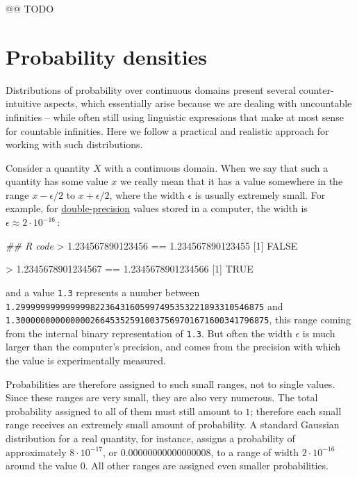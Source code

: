 \documentclass[
  a4paper,
  DIV=11,
  numbers=noendperiod,
  oneside]{scrreprt}
\newenvironment{Shaded}{\begin{snugshade}}{\end{snugshade}}
\newcommand{\ConstantTok}[1]{\textcolor[rgb]{0.56,0.35,0.01}{#1}}
\newcommand{\DecValTok}[1]{\textcolor[rgb]{0.68,0.00,0.00}{#1}}
\newcommand{\DocumentationTok}[1]{\textcolor[rgb]{0.37,0.37,0.37}{\textit{#1}}}
\newcommand{\FloatTok}[1]{\textcolor[rgb]{0.68,0.00,0.00}{#1}}
\newcommand{\NormalTok}[1]{\textcolor[rgb]{0.00,0.23,0.31}{#1}}
\newcommand{\SpecialCharTok}[1]{\textcolor[rgb]{0.37,0.37,0.37}{#1}}
\begin{document}
@@ TODO

\hypertarget{probability-densities}{%
\section{Probability densities}\label{probability-densities}}

Distributions of probability over continuous domains present several
counter-intuitive aspects, which essentially arise because we are
dealing with uncountable infinities -- while often still using
linguistic expressions that make at most sense for countable infinities.
Here we follow a practical and realistic approach for working with such
distributions.

Consider a quantity \(X\) with a continuous domain. When we say that
such a quantity has some value \(x\) we really mean that it has a value
somewhere in the range \(x -\epsilon/2\) to \(x+\epsilon/2\), where the
width \(\epsilon\) is usually extremely small. For example, for
\href{https://rdrr.io/r/base/double.html}{double-precision} values
stored in a computer, the width is
{\(\epsilon \approx 2\cdot 10^{-16}\)\,:}

\begin{Shaded}
\begin{Highlighting}[]
\DocumentationTok{\#\# R code}
\SpecialCharTok{\textgreater{}} \FloatTok{1.234567890123456} \SpecialCharTok{==} \FloatTok{1.234567890123455}
\NormalTok{[}\DecValTok{1}\NormalTok{] }\ConstantTok{FALSE}

\SpecialCharTok{\textgreater{}} \FloatTok{1.2345678901234567} \SpecialCharTok{==} \FloatTok{1.2345678901234566}
\NormalTok{[}\DecValTok{1}\NormalTok{] }\ConstantTok{TRUE}
\end{Highlighting}
\end{Shaded}

and a value \texttt{1.3} represents a number between
{\texttt{1.29999999999999982236431605997495353221893310546875}} and
{\texttt{1.300000000000000266453525910037569701671600341796875}}, this
range coming from the internal binary representation of \texttt{1.3}.
But often the width \(\epsilon\) is much larger than the computer's
precision, and comes from the precision with which the value is
experimentally measured.

Probabilities are therefore assigned to such small ranges, not to single
values. Since these ranges are very small, they are also very numerous.
The total probability assigned to all of them must still amount to
\(1\); therefore each small range receives an extremely small amount of
probability. A standard Gaussian distribution for a real quantity, for
instance, assigns a probability of approximately \(8\cdot 10^{-17}\), or
{\(0.00000000000000008\)}, to a range of width \(2\cdot 10^{-16}\)
around the value {\(0\).} All other ranges are assigned even smaller
probabilities.
\end{document}
